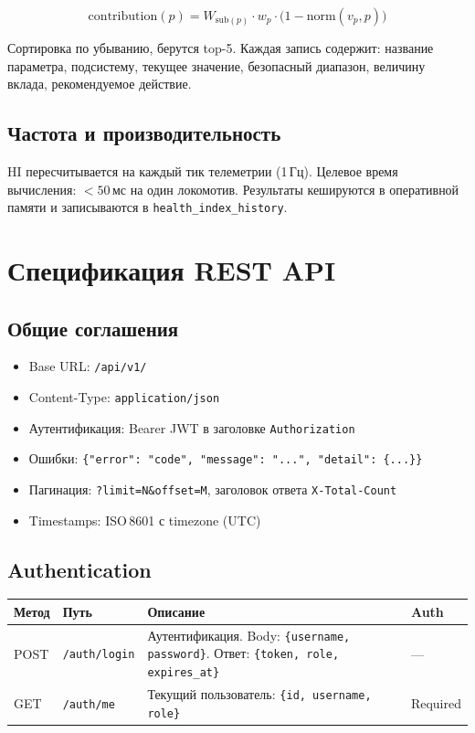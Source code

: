 \documentclass[12pt,a4paper]{article}
\newcommand{\code}[1]{\texttt{#1}}
\begin{document}
\[
\mathrm{contribution}(p) = W_{\text{sub}(p)} \cdot w_p \cdot \big(1 - \mathrm{norm}(v_p, p)\big)
\]

Сортировка по убыванию, берутся top-5. Каждая запись содержит: название параметра, подсистему, текущее значение, безопасный диапазон, величину вклада, рекомендуемое действие.

\subsection{Частота и производительность}

HI пересчитывается на каждый тик телеметрии (1\,Гц). Целевое время вычисления: $< 50$\,мс на один локомотив. Результаты кешируются в оперативной памяти и записываются в \code{health\_index\_history}.


\section{Спецификация REST API}
\label{sec:api}

\subsection{Общие соглашения}

\begin{itemize}[nosep]
  \item Base URL: \code{/api/v1/}
  \item Content-Type: \code{application/json}
  \item Аутентификация: Bearer JWT в заголовке \code{Authorization}
  \item Ошибки: \code{\{"error": "code", "message": "...", "detail": \{...\}\}}
  \item Пагинация: \code{?limit=N\&offset=M}, заголовок ответа \code{X-Total-Count}
  \item Timestamps: ISO\,8601 с timezone (UTC)
\end{itemize}

\subsection{Authentication}

\begin{tabularx}{\textwidth}{l l X l}
\toprule
\textbf{Метод} & \textbf{Путь} & \textbf{Описание} & \textbf{Auth} \\
\midrule
POST & \code{/auth/login} & Аутентификация. Body: \code{\{username, password\}}. Ответ: \code{\{token, role, expires\_at\}} & --- \\
GET & \code{/auth/me} & Текущий пользователь: \code{\{id, username, role\}} & Required \\
\bottomrule
\end{tabularx}
\end{document}
